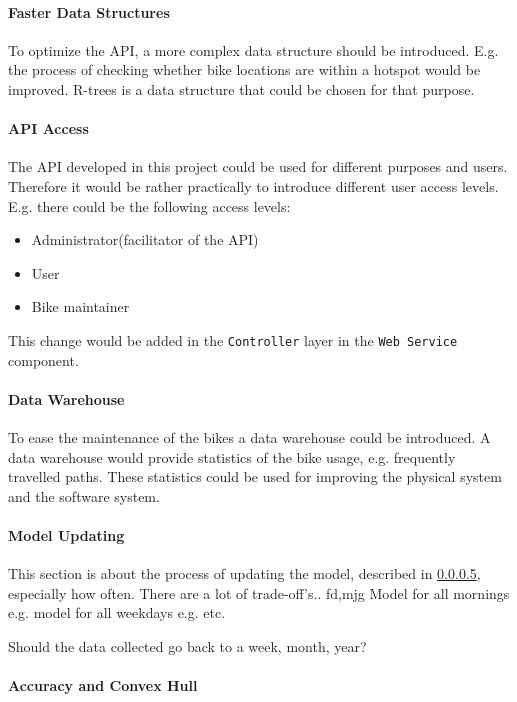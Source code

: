 \paragraph{Faster Data Structures}
To optimize the API, a more complex data structure should be introduced.
E.g. the process of checking whether bike locations are within a hotspot would be improved.
R-trees\cite[Section 25.3.5.3]{database_system_concepts} is a data structure that could be chosen for that purpose.

\paragraph{API Access}
The API developed in this project could be used for different purposes and users.
Therefore it would be rather practically to introduce different user access levels.
E.g. there could be the following access levels:
\begin{itemize}
\item Administrator(facilitator of the API)
\item User
\item Bike maintainer
\end{itemize}
This change would be added in the \texttt{Controller} layer in the \texttt{Web Service} component.

\paragraph{Data Warehouse \cite{data_warehousing}}
To ease the maintenance of the bikes a data warehouse could be introduced.
A data warehouse would provide statistics of the bike usage, e.g. frequently travelled paths.
These statistics could be used for improving the physical system and the software system.

\paragraph{Model Updating}
This section is about the process of updating the model, described in \cref{}, especially how often.
There are a lot of trade-off's.. fd,mjg  
Model for all mornings e.g.
model for all weekdays e.g.
etc.

Should the data collected go back to a week, month, year?

\paragraph{Accuracy and Convex Hull}

